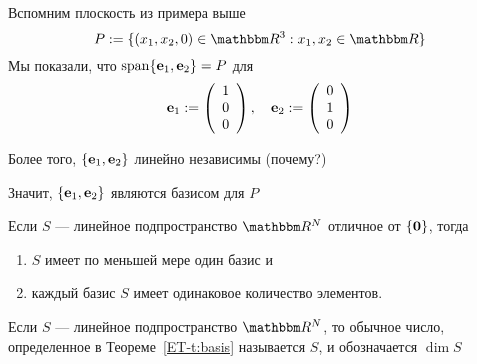 \begin{frame}
    
    \vspace{2em}
    \Eg
    Вспомним плоскость из примера выше 
    \begin{equation*}
        P := \setntn{(x_1, x_2, 0) \in \RR^3}{ x_1, x_2 \in \RR}
    \end{equation*}
    Мы показали, что $\operatorname{span}\{{\mathbf e}_1, {\mathbf e}_2\} = P$ для 
    \begin{equation*}
        {\mathbf e}_1 := 
        \left(
        \begin{array}{c}
            1 \\
            0 \\
            0
        \end{array}
        \right),
        \quad 
        {\mathbf e}_2 := 
        \left(
        \begin{array}{c}
            0 \\
            1 \\
            0
        \end{array}
        \right)
    \end{equation*}
    
    Более того, $\{{\mathbf e}_1, {\mathbf e}_2\}$ линейно независимы (почему?)

    Значит, $\{{\mathbf e}_1, {\mathbf e}_2\}$ являются базисом для $P$


\end{frame}

\begin{frame}

    \vspace{2em}
    \Thm{\eqref{ET-t:basis}}
    Если $S$ --- линейное подпространство $\RR^N$ отличное от $\{{\mathbf 0}\}$, тогда 
    \begin{enumerate}
        \item $S$ имеет по меньшей мере один базис и
        \item каждый базис $S$ имеет одинаковое количество элементов.
    \end{enumerate}
    Если $S$ --- линейное подпространство $\RR^N$, то обычное число, 
    определенное в Теореме~\ref{ET-t:basis} называется  $S$,
    и обозначается $\dim S$
    
\end{frame}

